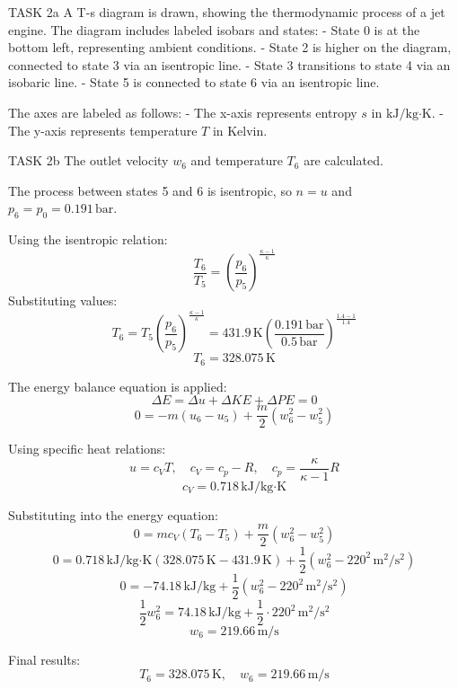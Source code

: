 TASK 2a  
A T-s diagram is drawn, showing the thermodynamic process of a jet engine. The diagram includes labeled isobars and states:  
- State 0 is at the bottom left, representing ambient conditions.  
- State 2 is higher on the diagram, connected to state 3 via an isentropic line.  
- State 3 transitions to state 4 via an isobaric line.  
- State 5 is connected to state 6 via an isentropic line.  

The axes are labeled as follows:  
- The x-axis represents entropy \( s \) in \( \text{kJ}/\text{kg·K} \).  
- The y-axis represents temperature \( T \) in Kelvin.  

TASK 2b  
The outlet velocity \( w_6 \) and temperature \( T_6 \) are calculated.  

The process between states 5 and 6 is isentropic, so \( n = u \) and \( p_6 = p_0 = 0.191 \, \text{bar} \).  

Using the isentropic relation:  
\[
\frac{T_6}{T_5} = \left( \frac{p_6}{p_5} \right)^{\frac{\kappa - 1}{\kappa}}
\]  
Substituting values:  
\[
T_6 = T_5 \left( \frac{p_6}{p_5} \right)^{\frac{\kappa - 1}{\kappa}} = 431.9 \, \text{K} \left( \frac{0.191 \, \text{bar}}{0.5 \, \text{bar}} \right)^{\frac{1.4 - 1}{1.4}}
\]  
\[
T_6 = 328.075 \, \text{K}
\]  

The energy balance equation is applied:  
\[
\Delta E = \Delta u + \Delta KE + \Delta PE = 0
\]  
\[
0 = -m \left( u_6 - u_5 \right) + \frac{m}{2} \left( w_6^2 - w_5^2 \right)
\]  

Using specific heat relations:  
\[
u = c_V T, \quad c_V = c_p - R, \quad c_p = \frac{\kappa}{\kappa - 1} R
\]  
\[
c_V = 0.718 \, \text{kJ}/\text{kg·K}
\]  

Substituting into the energy equation:  
\[
0 = m c_V \left( T_6 - T_5 \right) + \frac{m}{2} \left( w_6^2 - w_5^2 \right)
\]  
\[
0 = 0.718 \, \text{kJ}/\text{kg·K} \left( 328.075 \, \text{K} - 431.9 \, \text{K} \right) + \frac{1}{2} \left( w_6^2 - 220^2 \, \text{m}^2/\text{s}^2 \right)
\]  
\[
0 = -74.18 \, \text{kJ}/\text{kg} + \frac{1}{2} \left( w_6^2 - 220^2 \, \text{m}^2/\text{s}^2 \right)
\]  
\[
\frac{1}{2} w_6^2 = 74.18 \, \text{kJ}/\text{kg} + \frac{1}{2} \cdot 220^2 \, \text{m}^2/\text{s}^2
\]  
\[
w_6 = 219.66 \, \text{m/s}
\]  

Final results:  
\[
T_6 = 328.075 \, \text{K}, \quad w_6 = 219.66 \, \text{m/s}
\]